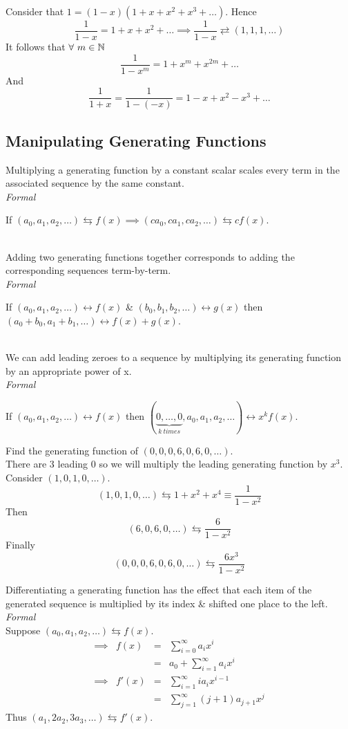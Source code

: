 \documentclass[11pt,a4paper]{article}
\begin{document}
Consider that $1=(1-x)(1+x+x^2+x^3+\dots)$. Hence
$$\frac{1}{1-x}=1+x+x^2+\dots\implies\frac{1}{1-x}\rightleftarrows(1,1,1,\dots)$$
It follows that $\forall\ m\in\mathbb{N}$
$$\frac{1}{1-x^m}=1+x^m+x^{2m}+\dots$$
And
$$\frac{1}{1+x}=\frac{1}{1-(-x)}=1-x+x^2-x^3+\dots$$

\subsection{Manipulating Generating Functions}

Multiplying a generating function by a constant scalar scales every term in the associated sequence by the same constant.\\
\textit{Formal}\\
\centerline{If $(a_0,a_1,a_2,\dots)\leftrightarrows f(x)\implies(ca_0,ca_1,ca_2,\dots)\leftrightarrows cf(x)$.}\\

Adding two generating functions together corresponds to adding the corresponding sequences term-by-term.\\
\textit{Formal}\\
\centerline{If $(a_0,a_1,a_2,\dots)\leftrightarrow f(x)$ \& $(b_0,b_1,b_2,\dots)\leftrightarrow g(x)$ then $(a_0+b_0,a_1+b_1,\dots)\leftrightarrow f(x)+g(x)$.}\\

We can add leading zeroes to a sequence by multiplying its generating function by an appropriate power of x.\\
\textit{Formal}\\
\centerline{If $(a_0,a_1,a_2,\dots)\leftrightarrow f(x)$ then $(\underbrace{0,\dots,0}_{k\ times},a_0,a_1,a_2,\dots)\leftrightarrow x^kf(x)$.}

Find the generating function of $(0,0,0,6,0,6,0,\dots)$.\\
There are $3$ leading 0 so we will multiply the leading generating function by $x^3$.\\
Consider $(1,0,1,0,\dots)$.
$$(1,0,1,0,\dots)\leftrightarrows1+x^2+x^4\equiv\frac{1}{1-x^2}$$
Then
$$(6,0,6,0,\dots)\leftrightarrows\frac{6}{1-x^2}$$
Finally
$$(0,0,0,6,0,6,0,\dots)\leftrightarrows\frac{6x^3}{1-x^2}$$

Differentiating a generating function has the effect that each item of the generated sequence is multiplied by its index \& shifted one place to the left.\\
\textit{Formal}\\
Suppose $(a_0,a_1,a_2,\dots)\leftrightarrows f(x)$.\\
\[\begin{array}{rrcl}
\implies&f(x)&=&\sum\limits_{i=0}^\infty a_ix^i\\
&&=&a_0+\sum\limits_{i=1}^\infty a_ix^i\\
\implies&f'(x)&=&\sum\limits_{i=1}^\infty ia_ix^{i-1}\\
&&=&\sum\limits_{j=1}^\infty(j+1)a_{j+1}x^j
\end{array}\]
Thus $(a_1,2a_2,3a_3,\dots)\leftrightarrows f'(x)$.\\
\end{document}
